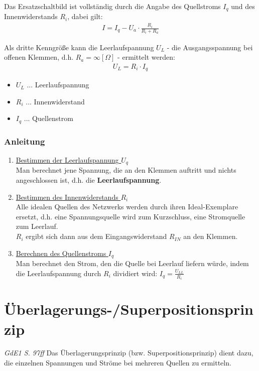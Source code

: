 Das Ersatzschaltbild ist vollständig durch die Angabe des Quellstroms $I_q$ und des Innenwiderstands $R_i$, dabei gilt:
\begin{align}
    I = I_q - U_a \cdot \frac{R_i}{R_i + R_a}
\end{align}

Als dritte Kenngröße kann die Leerlaufspannung $U_L$ - die Ausgangsspannung bei offenen Klemmen, d.h. $R_a = \infty[\Omega]$ - ermittelt werden:
\begin{align}
    U_L = R_i \cdot I_q
\end{align}
\begin{itemize}
    \item $U_L$ ... Leerlaufspannung
    \item $R_i$ ... Innenwiderstand
    \item $I_q$ ... Quellenstrom
\end{itemize}

\subsubsection*{Anleitung}
\begin{enumerate}
    \item \underline{Bestimmen der Leerlaufspannung $U_q$} \\
    Man berechnet jene Spannung, die an den Klemmen auftritt und nichts angeschlossen ist, d.h. die \textbf{Leerlaufspannung}.
    
    \item \underline{Bestimmen des Innenwiderstands $R_i$} \\
    Alle idealen Quellen des Netzwerks werden durch ihren Ideal-Exemplare ersetzt, d.h. eine Spannungsquelle wird zum Kurzschluss, eine Stromquelle zum Leerlauf. \\
    $R_i$ ergibt sich dann aus dem Eingangswiderstand $R_{IN}$ an den Klemmen.
    
    \item \underline{Berechnen des Quellenstroms $I_q$} \\
    Man berechnet den Strom, den die Quelle bei Leerlauf liefern würde, indem die Leerlaufspannung durch $R_i$ dividiert wird: $I_q = \frac{U_{LL}}{R_i}$ 
\end{enumerate}


\section{Überlagerungs-/Superpositionsprinzip}
\textit{GdE1 S. 97ff}
Das Überlagerungsprinzip (bzw. Superpositionsprinzip) dient dazu, die einzelnen Spannungen und Ströme bei mehreren Quellen zu ermitteln.

